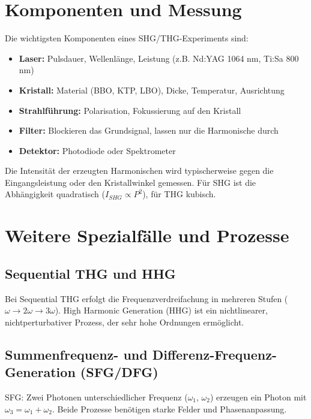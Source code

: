 \documentclass[9pt,a4paper,twocolumn,twoside]{tau-class/tau}
\begin{document}

\section{Komponenten und Messung}
Die wichtigsten Komponenten eines SHG/THG-Experiments sind:
\begin{itemize}
    \item \textbf{Laser:} Pulsdauer, Wellenlänge, Leistung (z.B. Nd:YAG 1064 nm, Ti:Sa 800 nm)
    \item \textbf{Kristall:} Material (BBO, KTP, LBO), Dicke, Temperatur, Ausrichtung
    \item \textbf{Strahlführung:} Polarisation, Fokussierung auf den Kristall
    \item \textbf{Filter:} Blockieren das Grundsignal, lassen nur die Harmonische durch
    \item \textbf{Detektor:} Photodiode oder Spektrometer
\end{itemize}
Die Intensität der erzeugten Harmonischen wird typischerweise gegen die Eingangsleistung oder den Kristallwinkel gemessen. Für SHG ist die Abhängigkeit quadratisch ($I_{SHG} \propto P^2$), für THG kubisch.



\section{Weitere Spezialfälle und Prozesse}
\subsection{Sequential THG und HHG}
Bei Sequential THG erfolgt die Frequenzverdreifachung in mehreren Stufen ($\omega \rightarrow 2\omega \rightarrow 3\omega$). High Harmonic Generation (HHG) ist ein nichtlinearer, nichtperturbativer Prozess, der sehr hohe Ordnungen ermöglicht.

\subsection{Summenfrequenz- und Differenz-Frequenz-Generation (SFG/DFG)}
SFG: Zwei Photonen unterschiedlicher Frequenz ($\omega_1$, $\omega_2$) erzeugen ein Photon mit $\omega_3 = \omega_1 + \omega_2$. Beide Prozesse benötigen starke Felder und Phasenanpassung.
\end{document}
